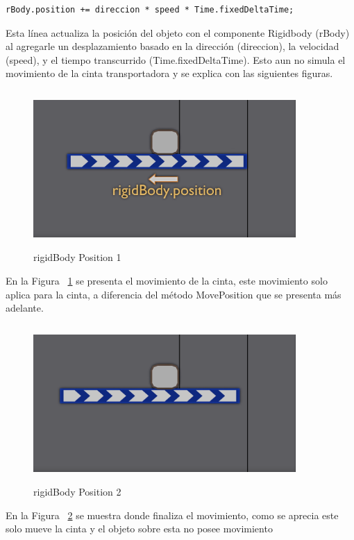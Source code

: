 \begin{lstlisting}[frame=single]
        rBody.position += direccion * speed * Time.fixedDeltaTime;
\end{lstlisting}
Esta línea actualiza la posición del objeto con el componente Rigidbody (rBody) al agregarle un desplazamiento basado en la dirección (direccion), la velocidad (speed), y el tiempo transcurrido (Time.fixedDeltaTime). Esto aun no simula el movimiento de la cinta transportadora y se explica con las siguientes figuras. 
\begin{figure}[h]
\centering
\includegraphics[width=10cm, height=6cm]{figures/rbodyposition1.png}
\caption{rigidBody Position 1}
\label{fig:rbodyposition1}
\end{figure}


En la Figura ~\ref{fig:rbodyposition1} se presenta el movimiento de la cinta, este movimiento solo aplica para la cinta, a diferencia del método MovePosition que se presenta más adelante.
\clearpage

\begin{figure}[h]
\centering
\includegraphics[width=10cm, height=6cm]{figures/rbodyposition2.png}
\caption{rigidBody Position 2}
\label{fig:rbodyposition2}
\end{figure}

En la Figura ~\ref{fig:rbodyposition2} se muestra donde finaliza el movimiento, como se aprecia este solo mueve la cinta y el objeto sobre esta no posee movimiento

